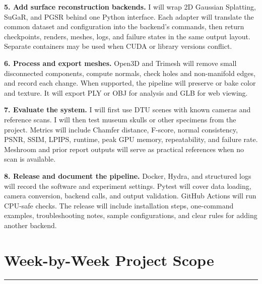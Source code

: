 \documentclass[10pt]{article}
\newcommand{\sectionrule}{\vspace{-4pt}\color{rulegray}\hrule\color{black}\vspace{5pt}}
\begin{document}
\textbf{5. Add surface reconstruction backends.} I will wrap 2D Gaussian Splatting, SuGaR, and PGSR behind one Python interface. Each adapter will translate the common dataset and configuration into the backend's commands, then return checkpoints, renders, meshes, logs, and failure states in the same output layout. Separate containers may be used when CUDA or library versions conflict.

\textbf{6. Process and export meshes.} Open3D and Trimesh will remove small disconnected components, compute normals, check holes and non-manifold edges, and record each change. When supported, the pipeline will preserve or bake color and texture. It will export PLY or OBJ for analysis and GLB for web viewing.

\textbf{7. Evaluate the system.} I will first use DTU scenes with known cameras and reference scans. I will then test museum skulls or other specimens from the project. Metrics will include Chamfer distance, F-score, normal consistency, PSNR, SSIM, LPIPS, runtime, peak GPU memory, repeatability, and failure rate. Meshroom and prior report outputs will serve as practical references when no scan is available.

\textbf{8. Release and document the pipeline.} Docker, Hydra, and structured logs will record the software and experiment settings. Pytest will cover data loading, camera conversion, backend calls, and output validation. GitHub Actions will run CPU-safe checks. The release will include installation steps, one-command examples, troubleshooting notes, sample configurations, and clear rules for adding another backend.

\section*{Week-by-Week Project Scope}
\sectionrule
\end{document}
